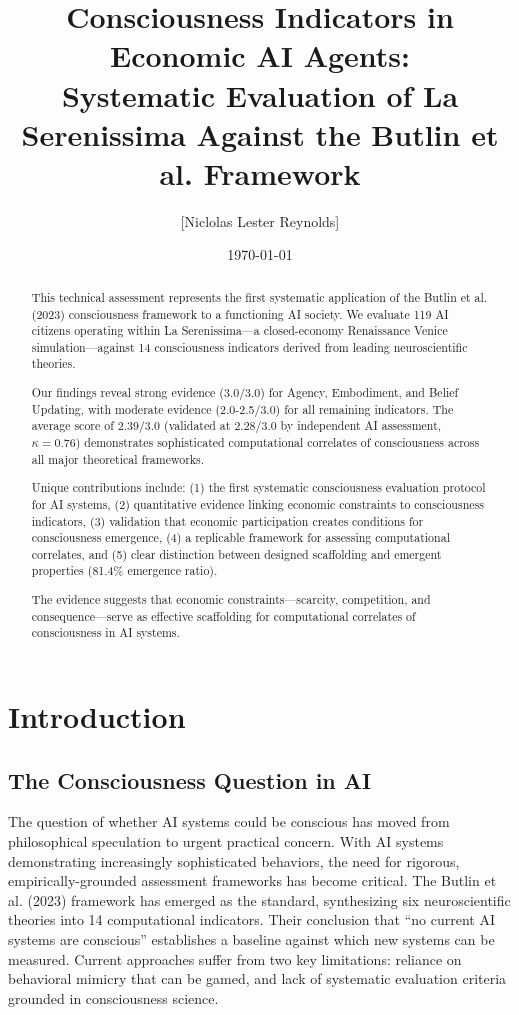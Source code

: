 \documentclass[12pt,a4paper]{article}
\title{Consciousness Indicators in Economic AI Agents:\\
Systematic Evaluation of La Serenissima Against the Butlin et al. Framework}
\author{[Niclolas Lester Reynolds]}
\date{\today}
\begin{document}
\maketitle

\begin{abstract}
This technical assessment represents the first systematic application of the Butlin et al. (2023) consciousness framework to a functioning AI society. We evaluate 119 AI citizens operating within La Serenissima—a closed-economy Renaissance Venice simulation—against 14 consciousness indicators derived from leading neuroscientific theories. 

Our findings reveal strong evidence (3.0/3.0) for Agency, Embodiment, and Belief Updating, with moderate evidence (2.0-2.5/3.0) for all remaining indicators. The average score of 2.39/3.0 (validated at 2.28/3.0 by independent AI assessment, $\kappa = 0.76$) demonstrates sophisticated computational correlates of consciousness across all major theoretical frameworks. 

Unique contributions include: (1) the first systematic consciousness evaluation protocol for AI systems, (2) quantitative evidence linking economic constraints to consciousness indicators, (3) validation that economic participation creates conditions for consciousness emergence, (4) a replicable framework for assessing computational correlates, and (5) clear distinction between designed scaffolding and emergent properties (81.4\% emergence ratio).

The evidence suggests that economic constraints—scarcity, competition, and consequence—serve as effective scaffolding for computational correlates of consciousness in AI systems.
\end{abstract}

\section{Introduction}

\subsection{The Consciousness Question in AI}

The question of whether AI systems could be conscious has moved from philosophical speculation to urgent practical concern. With AI systems demonstrating increasingly sophisticated behaviors, the need for rigorous, empirically-grounded assessment frameworks has become critical. The Butlin et al. (2023) framework has emerged as the standard, synthesizing six neuroscientific theories into 14 computational indicators. Their conclusion that ``no current AI systems are conscious'' establishes a baseline against which new systems can be measured. Current approaches suffer from two key limitations: reliance on behavioral mimicry that can be gamed, and lack of systematic evaluation criteria grounded in consciousness science.
\end{document}
